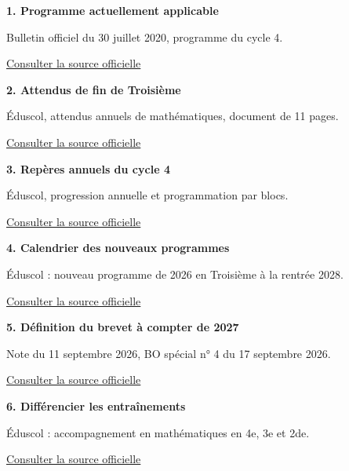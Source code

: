\clearpage\thispagestyle{otFront}\label{references}\fontsize{11}{15}\selectfont
\par\medskip\textbf{1. Programme actuellement applicable}\par Bulletin officiel du 30 juillet 2020, programme du cycle 4.\par\href{https://www.education.gouv.fr/bo/20/Hebdo31/MENE2018714A.htm}{\textcolor{otGreenDark}{Consulter la source officielle}}\par
\par\medskip\textbf{2. Attendus de fin de Troisième}\par Éduscol, attendus annuels de mathématiques, document de 11 pages.\par\href{https://eduscol.education.gouv.fr/sites/default/files/document/18-maths-3e-attendus-eduscol1114748pdf-74688.pdf}{\textcolor{otGreenDark}{Consulter la source officielle}}\par
\par\medskip\textbf{3. Repères annuels du cycle 4}\par Éduscol, progression annuelle et programmation par blocs.\par\href{https://eduscol.education.gouv.fr/sites/default/files/document/26-maths-c4-reperes-eduscol1114756pdf-74694.pdf}{\textcolor{otGreenDark}{Consulter la source officielle}}\par
\par\medskip\textbf{4. Calendrier des nouveaux programmes}\par Éduscol : nouveau programme de 2026 en Troisième à la rentrée 2028.\par\href{https://eduscol.education.gouv.fr/5736/ressources-d-accompagnement-du-programme-de-mathematiques-au-cycle-4}{\textcolor{otGreenDark}{Consulter la source officielle}}\par
\par\medskip\textbf{5. Définition du brevet à compter de 2027}\par Note du 11 septembre 2026, BO spécial n° 4 du 17 septembre 2026.\par\href{https://www.education.gouv.fr/bo/2026/Hebdo4/MENE2623228N}{\textcolor{otGreenDark}{Consulter la source officielle}}\par
\par\medskip\textbf{6. Différencier les entraînements}\par Éduscol : accompagnement en mathématiques en 4e, 3e et 2de.\par\href{https://eduscol.education.gouv.fr/6858/accompagner-les-eleves-en-mathematiques-4e-3e-et-2de}{\textcolor{otGreenDark}{Consulter la source officielle}}\par
